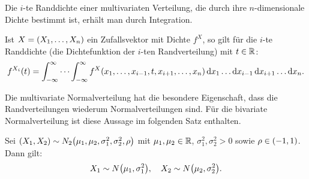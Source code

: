 \documentclass{lecture}
\begin{document}
    Die \(i\)-te Randdichte einer multivariaten Verteilung, die durch ihre \(n\)-dimensionale Dichte bestimmt ist, erhält man durch Integration.

    \begin{remark}
        Ist \(X = \parentheses*{X_1, \ldots, X_n}\) ein Zufallsvektor mit Dichte \(f^X\), so gilt für die \(i\)-te Randdichte (die Dichtefunktion der \(i\)-ten Randverteilung) mit \(t \in \R\):
        \[
            f^{X_i}\parentheses*{t} = \int_{-\infty}^\infty \cdots \int_{-\infty}^\infty f^X\parentheses*{x_1, \ldots, x_{i - 1}, t, x_{i + 1}, \ldots, x_n}\d x_1 \ldots \d x_{i - 1} \d x_{i + 1} \ldots \d x_n.
        \]
    \end{remark}

    Die multivariate Normalverteilung hat die besondere Eigenschaft, dass die Randverteilungen wiederum Normalverteilungen sind.
    Für die bivariate Normalverteilung ist diese Aussage im folgenden Satz enthalten.

    \begin{theorem}
        Sei \(\parentheses*{X_1, X_2} \sim N_2\parentheses*{\mu_1, \mu_2, \sigma_1^2, \sigma_2^2, \rho}\) mit \(\mu_1, \mu_2 \in \R\), \(\sigma_1^2, \sigma_2^2 > 0\) sowie \(\rho \in \parentheses*{-1, 1}\).
        Dann gilt:
        \[
            X_1 \sim N\parentheses*{\mu_1, \sigma_1^2}, \quad X_2 \sim N\parentheses*{\mu_2, \sigma_2^2}.
        \]
    \end{theorem}
\end{document}
